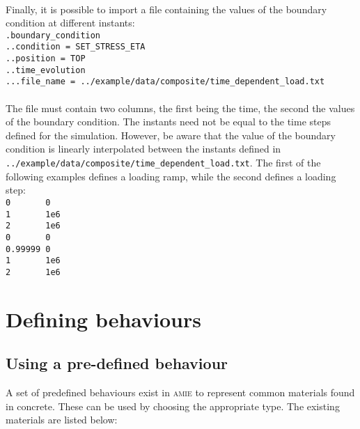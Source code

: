\documentclass[10pt]{article}
\begin{document}
\paragraph{}Finally, it is possible to import a file containing the values of the boundary condition at different instants:\\

\noindent \verb+.boundary_condition+\\
\verb+..condition = SET_STRESS_ETA+\\
\verb+..position = TOP+\\
\verb+..time_evolution+\\
\verb+...file_name = ../example/data/composite/time_dependent_load.txt+

\paragraph{}The file must contain two columns, the first being the time, the second the values of the boundary condition. The instants need not be equal to the time steps defined for the simulation. However, be aware that the value of the boundary condition is linearly interpolated between the instants defined in \verb+../example/data/composite/time_dependent_load.txt+. The first of the following examples defines a loading ramp, while the second defines a loading step:\\

\noindent \verb+0       0+\\
\verb+1       1e6+\\
\verb+2       1e6+\\

\noindent \verb+0       0+\\
\verb+0.99999 0+\\
\verb+1       1e6+\\
\verb+2       1e6+\\

\section{Defining behaviours}

\subsection{Using a pre-defined behaviour}

A set of predefined behaviours exist in \textsc{amie} to represent common materials found in concrete. These can be used by choosing the appropriate type. The existing materials are listed below:\\
\end{document}
